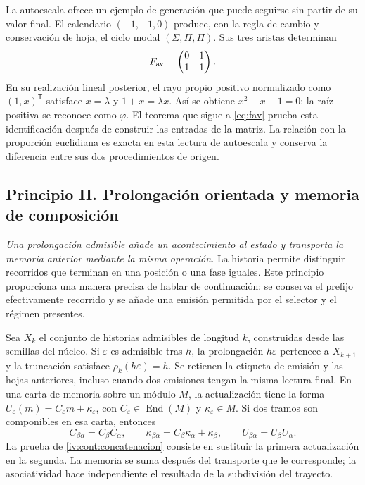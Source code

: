 La autoescala ofrece un ejemplo de generación que puede seguirse sin partir
de su valor final. El calendario \((+1,-1,0)\) produce, con la regla de
cambio y conservación de hoja, el ciclo modal
\((\Sigma,\Pi,\Pi)\). Sus tres aristas determinan
\[
 F_{\rm av}=\begin{pmatrix}0&1\\1&1\end{pmatrix}.
\]
En su realización lineal posterior, el rayo propio positivo normalizado
como \((1,x)^{\mathsf T}\) satisface \(x=\lambda\) y
\(1+x=\lambda x\). Así se obtiene \(x^2-x-1=0\); la raíz positiva se
reconoce como \(\varphi\). El teorema que sigue a \eqref{eq:fav} prueba
esta identificación después de construir las entradas de la matriz.
La relación con la proporción euclidiana es exacta en esta lectura de
autoescala y conserva la diferencia entre sus dos procedimientos de origen.

\subsection*{Principio II. Prolongación orientada y memoria de composición}
\hypertarget{prinh:prolongacion}{}

\emph{Una prolongación admisible añade un acontecimiento al estado y
transporta la memoria anterior mediante la misma operación.} La historia
permite distinguir recorridos que terminan en una posición o una fase
iguales. Este principio proporciona una manera precisa de hablar de
continuación: se conserva el prefijo efectivamente recorrido y se añade
una emisión permitida por el selector y el régimen presentes.

Sea \(X_k\) el conjunto de historias admisibles de longitud \(k\),
construidas desde las semillas del núcleo. Si \(\varepsilon\) es admisible
tras \(h\), la prolongación \(h\varepsilon\) pertenece a \(X_{k+1}\)
y la truncación satisface \(\rho_k(h\varepsilon)=h\). Se retienen la
etiqueta de emisión y las hojas anteriores, incluso cuando dos emisiones
tengan la misma lectura final. En una carta de memoria sobre un módulo
\(M\), la actualización tiene la forma
\(U_\varepsilon(m)=C_\varepsilon m+\kappa_\varepsilon\), con
\(C_\varepsilon\in\operatorname{End}(M)\) y
\(\kappa_\varepsilon\in M\). Si dos tramos son componibles en esa
carta, entonces
\[
 C_{\beta\alpha}=C_\beta C_\alpha,\qquad
 \kappa_{\beta\alpha}=C_\beta\kappa_\alpha+\kappa_\beta,
 \qquad U_{\beta\alpha}=U_\beta U_\alpha.
\]
La prueba de \cref{iv:cont:concatenacion} consiste en sustituir la primera
actualización en la segunda. La memoria se suma después del transporte que
le corresponde; la asociatividad hace independiente el resultado de la
subdivisión del trayecto.

